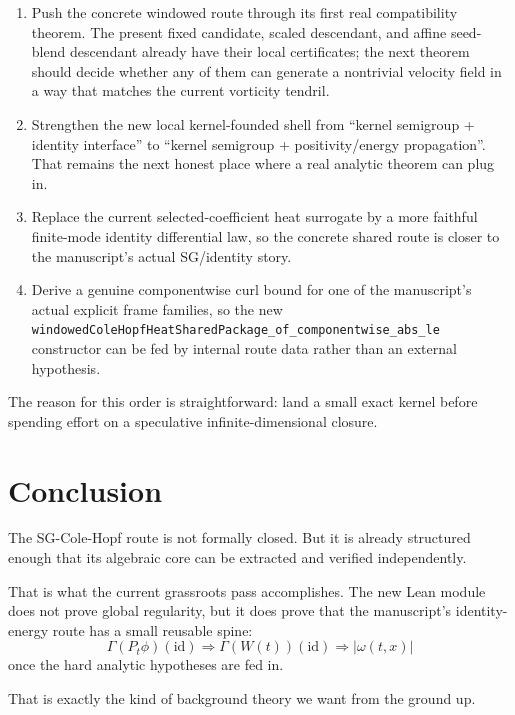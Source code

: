 \documentclass[11pt]{article}
\theoremstyle{remark}
\begin{document}
\begin{enumerate}[leftmargin=1.5em]
  \item Push the concrete windowed route through its first real compatibility
  theorem.  The present fixed candidate, scaled descendant, and affine
  seed-blend descendant already have their local certificates; the next theorem
  should decide whether any of them can generate a nontrivial velocity field in
  a way that matches the current vorticity tendril.
  \item Strengthen the new local kernel-founded shell from ``kernel semigroup +
  identity interface'' to ``kernel semigroup + positivity/energy propagation''.
  That remains the next honest place where a real analytic theorem can plug in.
  \item Replace the current selected-coefficient heat surrogate by a more
  faithful finite-mode identity differential law, so the concrete shared route
  is closer to the manuscript's actual SG/identity story.
  \item Derive a genuine componentwise curl bound for one of the manuscript's
  actual explicit frame families, so the new
  \texttt{windowedColeHopfHeatSharedPackage\_of\_componentwise\_abs\_le}
  constructor can be fed by internal route data rather than an external
  hypothesis.
\end{enumerate}

The reason for this order is straightforward: land a small exact kernel before
spending effort on a speculative infinite-dimensional closure.

\section{Conclusion}

The SG-Cole-Hopf route is not formally closed.  But it is already structured
enough that its algebraic core can be extracted and verified independently.

That is what the current grassroots pass accomplishes.  The new Lean module does
not prove global regularity, but it does prove that the manuscript's
identity-energy route has a small reusable spine:
\[
  \Gamma(P_t \phi)(\mathrm{id})
  \Longrightarrow
  \Gamma(W(t))(\mathrm{id})
  \Longrightarrow
  |\omega(t,x)|
\]
once the hard analytic hypotheses are fed in.

That is exactly the kind of background theory we want from the ground up.
\end{document}
